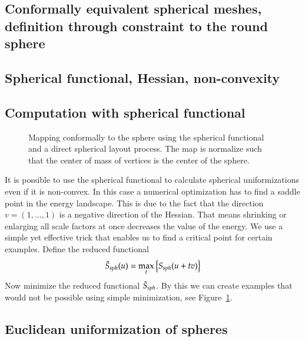 \documentclass[Thesis.tex]{subfiles}
\begin{document}
\subsection{Conformally equivalent spherical meshes, definition through constraint to the round sphere}
\subsection{Spherical functional, Hessian, non-convexity}
\subsection{Computation with spherical functional}

\begin{figure}
\centering
{}
\caption{Mapping conformally to the sphere using the spherical functional and a direct spherical layout process. The map is normalize such that the center of mass of vertices is the center of the sphere.}
\label{fig:spherical_examples}
\end{figure}

It is possible to use the spherical functional to calculate spherical uniformizations even if it is non-convex. In this case a numerical optimization has to find a saddle point in the energy landscape. This is due to the fact that the direction $v=(1,\ldots,1)$ is a negative direction of the Hessian. That means shrinking or enlarging all scale factors at once decreases the value of the energy. We use a simple yet effective trick that enables us to find a critical point for certain examples. Define the reduced functional
\begin{equation}
\label{eq:reduced_spherical}
\tilde S_{\it sph}(u)=\max_t \left\{S_{\it sph}(u + tv)\right\}
\end{equation}
Now minimize the reduced functional $\tilde  S_{\it sph}$. By this we can create examples that would not be possible using simple minimization, see Figure~\ref{fig:spherical_examples}.

\subsection{Euclidean uniformization of spheres}
\end{document}
